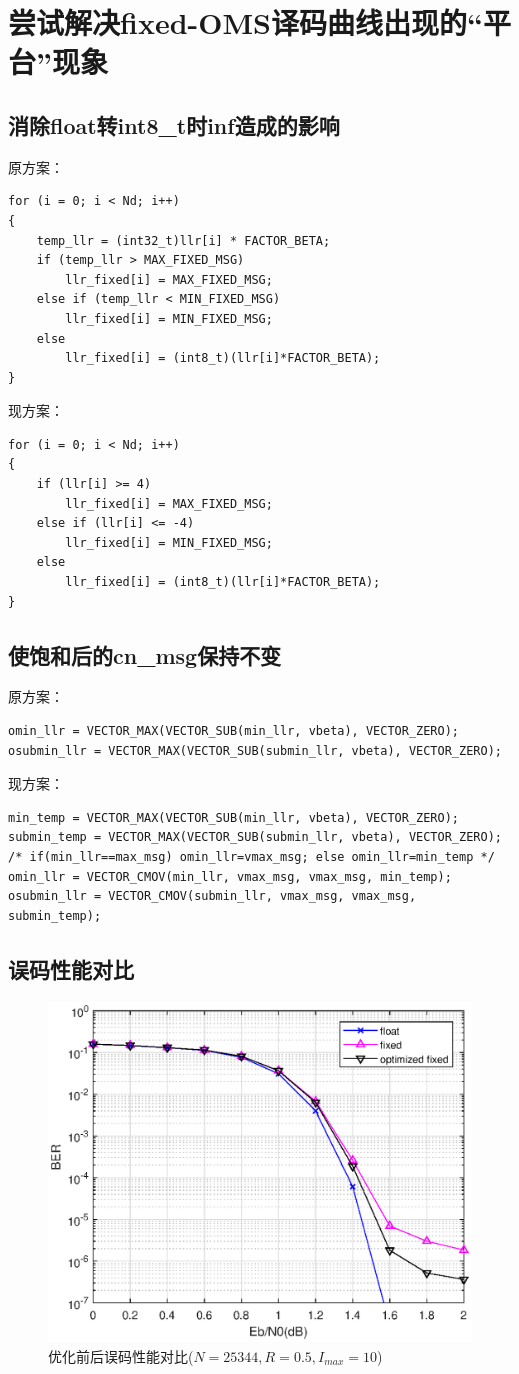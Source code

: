 \documentclass{article}
\begin{document}
\section{尝试解决fixed-OMS译码曲线出现的“平台”现象}
\subsection{消除float转int8\_t时inf造成的影响}
原方案：
\lstset{language=C++}
\begin{lstlisting}
for (i = 0; i < Nd; i++)
{
	temp_llr = (int32_t)llr[i] * FACTOR_BETA;
	if (temp_llr > MAX_FIXED_MSG)
		llr_fixed[i] = MAX_FIXED_MSG;
	else if (temp_llr < MIN_FIXED_MSG)
		llr_fixed[i] = MIN_FIXED_MSG;
	else
		llr_fixed[i] = (int8_t)(llr[i]*FACTOR_BETA);
}
\end{lstlisting}
现方案：
\lstset{language=C++}
\begin{lstlisting}
for (i = 0; i < Nd; i++)
{
	if (llr[i] >= 4)
		llr_fixed[i] = MAX_FIXED_MSG;
	else if (llr[i] <= -4)
		llr_fixed[i] = MIN_FIXED_MSG;
	else
		llr_fixed[i] = (int8_t)(llr[i]*FACTOR_BETA);
}
\end{lstlisting}
\subsection{使饱和后的cn\_msg保持不变}
原方案：
\lstset{language=C++}
\begin{lstlisting}
omin_llr = VECTOR_MAX(VECTOR_SUB(min_llr, vbeta), VECTOR_ZERO);
osubmin_llr = VECTOR_MAX(VECTOR_SUB(submin_llr, vbeta), VECTOR_ZERO);
\end{lstlisting}
现方案：
\lstset{language=C++}
\begin{lstlisting}
min_temp = VECTOR_MAX(VECTOR_SUB(min_llr, vbeta), VECTOR_ZERO);
submin_temp = VECTOR_MAX(VECTOR_SUB(submin_llr, vbeta), VECTOR_ZERO);
/* if(min_llr==max_msg) omin_llr=vmax_msg; else omin_llr=min_temp */
omin_llr = VECTOR_CMOV(min_llr, vmax_msg, vmax_msg, min_temp);
osubmin_llr = VECTOR_CMOV(submin_llr, vmax_msg, vmax_msg, submin_temp);
\end{lstlisting}
\subsection{误码性能对比}
\begin{figure}[H]
	\centering
	\includegraphics[width = .7\textwidth]{fig.eps}
	\caption{优化前后误码性能对比($N=25344,R=0.5,I_{max}=10$)}
\end{figure}
\end{document}
